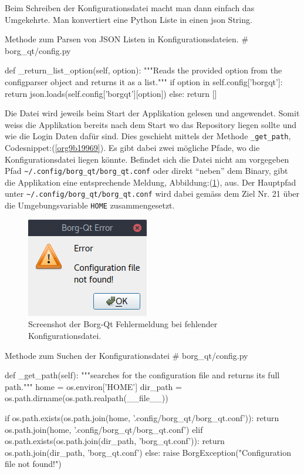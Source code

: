Beim Schreiben der Konfigurationsdatei macht man dann einfach das Umgekehrte.
Man konvertiert eine Python Liste in einen \gls{json} String.

\begin{sexylisting}[label=orgd4f11c4]{Methode zum Parsen von JSON Listen in Konfigurationsdateien.}
# borg_qt/config.py

def _return_list_option(self, option):
    """Reads the provided option from the configparser object and returns
    it as a list."""
    if option in self.config['borgqt']:
        return json.loads(self.config['borgqt'][option])
    else:
        return []
\end{sexylisting}

Die Datei wird jeweils beim Start der Applikation gelesen und angewendet. Somit
weiss die Applikation bereits nach dem Start wo das Repository liegen sollte
und wie die Login Daten dafür sind. Dies geschieht mittels der Methode
\texttt{\_get\_path}, Codesnippet:(\ref{org9b19969}). Es gibt dabei zwei mögliche Pfade,
wo die Konfigurationsdatei liegen könnte. Befindet sich die Datei nicht am
vorgegeben Pfad \texttt{\textasciitilde{}/.config/borg\_qt/borg\_qt.conf} oder direkt "`neben"' dem
Binary, gibt die Applikation eine entsprechende Meldung,
Abbildung:(\ref{fig:orgb4e2c3c}), aus. Der Hauptpfad unter
\texttt{\textasciitilde{}/.config/borg\_qt/borg\_qt.conf} wird dabei gemäss dem Ziel Nr. 21 über die
Umgebungsvariable \texttt{HOME} zusammengesetzt.

\begin{figure}[H]
\centering
\includegraphics[width=.3\textwidth]{pictures/borgqt_missing_config.png}
\caption{\label{fig:orgb4e2c3c}
Screenshot der Borg-Qt Fehlermeldung bei fehlender Konfigurationsdatei.}
\end{figure}

\begin{sexylisting}[label=org9b19969]{Methode zum Suchen der Konfigurationsdatei}
# borg_qt/config.py

def _get_path(self):
    """searches for the configuration file and returns its full path."""
    home = os.environ['HOME']
    dir_path = os.path.dirname(os.path.realpath(__file__))

    if os.path.exists(os.path.join(home, '.config/borg_qt/borg_qt.conf')):
        return os.path.join(home, '.config/borg_qt/borg_qt.conf')
    elif os.path.exists(os.path.join(dir_path, 'borg_qt.conf')):
        return os.path.join(dir_path, 'borg_qt.conf')
    else:
        raise BorgException("Configuration file not found!")
\end{sexylisting}

